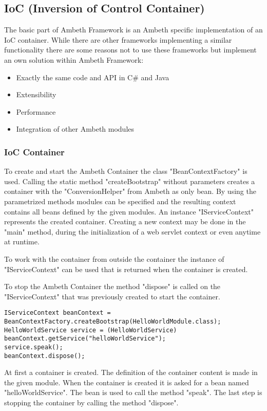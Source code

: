 \subsection{IoC (Inversion of Control Container)}
The basic part of Ambeth Framework is an Ambeth specific implementation of an IoC container. While there are other frameworks implementing a similar functionality there are some reasons not to use these frameworks but implement an own solution within Ambeth Framework:

\begin{itemize}
	\item Exactly the same code and API in C\# and Java
	\item Extensibility
	\item Performance
	\item Integration of other Ambeth modules
\end{itemize}

\subsubsection{IoC Container}
\TODO

To create and start the Ambeth Container the class "BeanContextFactory" is used. Calling the static method "createBootstrap" without parameters creates a container with the "ConversionHelper" from Ambeth as only bean. By using the parametrized methods modules can be specified and the resulting context contains all beans defined by the given modules. An instance "IServiceContext" represents the created container.
Creating a new context may be done in the "main" method, during the initialization of a web servlet context or even anytime at runtime.

To work with the container from outside the container the instance of "IServiceContext" can be used that is returned when the container is created.

To stop the Ambeth Container the method "dispose" is called on the "IServiceContext" that was previously created to start the container.


\begin{lstlisting}[style=Java,caption={Start, use and stop an Ambeth Bean Container}]
IServiceContext beanContext = BeanContextFactory.createBootstrap(HelloWorldModule.class);
HelloWorldService service = (HelloWorldService) beanContext.getService("helloWorldService");
service.speak();
beanContext.dispose();
\end{lstlisting}
At first a container is created. The definition of the container content is made in the given module. When the container is created it is asked for a bean named "helloWorldService". The bean is used to call the method "speak". The last step is stopping the container by calling the method "dispose".

